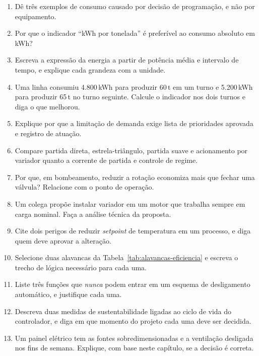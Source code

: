 \begin{exercicios}
\begin{enumerate}[label=\alph*)]
  \item Dê três exemplos de consumo causado por decisão de programação, e não por equipamento.
  \item Por que o indicador ``kWh por tonelada'' é preferível ao consumo absoluto em kWh?
  \item Escreva a expressão da energia a partir de potência média e intervalo de tempo, e explique
        cada grandeza com a unidade.
  \item Uma linha consumiu 4.800\,kWh para produzir 60\,t em um turno e 5.200\,kWh para produzir 65\,t
        no turno seguinte. Calcule o indicador nos dois turnos e diga o que melhorou.
  \item Explique por que a limitação de demanda exige lista de prioridades aprovada e registro de
        atuação.
  \item Compare partida direta, estrela-triângulo, partida suave e acionamento por variador quanto a
        corrente de partida e controle de regime.
  \item Por que, em bombeamento, reduzir a rotação economiza mais que fechar uma válvula? Relacione
        com o ponto de operação.
  \item Um colega propõe instalar variador em um motor que trabalha sempre em carga nominal. Faça a
        análise técnica da proposta.
  \item Cite dois perigos de reduzir \emph{setpoint} de temperatura em um processo, e diga quem deve
        aprovar a alteração.
  \item Selecione duas alavancas da Tabela~\ref{tab:alavancas-eficiencia} e escreva o trecho de lógica
        necessário para cada uma.
  \item Liste três funções que \emph{nunca} podem entrar em um esquema de desligamento automático, e
        justifique cada uma.
  \item Descreva duas medidas de sustentabilidade ligadas ao ciclo de vida do controlador, e diga em
        que momento do projeto cada uma deve ser decidida.
  \item Um painel elétrico tem as fontes sobredimensionadas e a ventilação desligada nos fins de
        semana. Explique, com base neste capítulo, se a decisão é correta.
\end{enumerate}
\end{exercicios}
